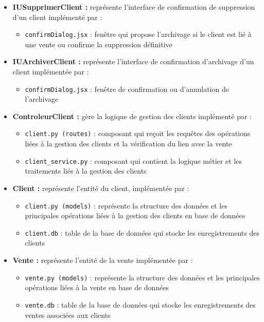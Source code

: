 \begin{itemize}[leftmargin=2em, topsep=4pt, itemsep=4pt]
  \begin{itemize}[leftmargin=2em, topsep=2pt, itemsep=2pt]
    \item \texttt{ClientForm.jsx} : formulaire contenant les données du client tels que (type, nom, prénom, email, téléphone, ville, adresse)
  \end{itemize}
  \item \textbf{IUSupprimerClient :} représente l'interface de confirmation de suppression d'un client implémenté par :
  \begin{itemize}[leftmargin=2em, topsep=2pt, itemsep=2pt]
    \item \texttt{confirmDialog.jsx} : fenêtre qui propose l'archivage si le client est lié à une vente ou confirme la suppression définitive
  \end{itemize}
  \item \textbf{IUArchiverClient :} représente l'interface de confirmation d'archivage d'un client implémentée par :
  \begin{itemize}[leftmargin=2em, topsep=2pt, itemsep=2pt]
    \item \texttt{confirmDialog.jsx} : fenêtre de confirmation ou d'annulation de l'archivage
  \end{itemize}
  \item \textbf{ControleurClient :} gère la logique de gestion des clients implémenté par :
  \begin{itemize}[leftmargin=2em, topsep=2pt, itemsep=2pt]
    \item \texttt{client.py (routes)} : composant qui reçoit les requêtes des opérations liées à la gestion des clients et la vérification du lien avec la vente
    \item \texttt{client\_service.py} : composant qui contient la logique métier et les traitements liés à la gestion des clients
  \end{itemize}
  \item \textbf{Client :} représente l'entité du client, implémentée par :
  \begin{itemize}[leftmargin=2em, topsep=2pt, itemsep=2pt]
    \item \texttt{client.py (models)} : représente la structure des données et les principales opérations liées à la gestion des clients en base de données
    \item \texttt{client.db} : table de la base de données qui stocke les enregistrements des clients
  \end{itemize}
  \item \textbf{Vente :} représente l'entité de la vente implémentée par :
  \begin{itemize}[leftmargin=2em, topsep=2pt, itemsep=2pt]
    \item \texttt{vente.py (models)} : représente la structure des données et les principales opérations liées à la vente en base de données
    \item \texttt{vente.db} : table de la base de données qui stocke les enregistrements des ventes associées aux clients
  \end{itemize}
\end{itemize}

